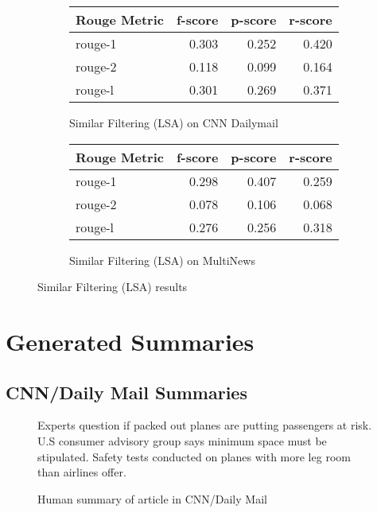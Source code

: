 \documentclass[../writeup.tex]{subfiles}
\begin{document}
\begin{figure}[H]
    \centering
    \begin{subfigure}{0.5\linewidth}
        \begin{tabular}{lrrr}
            \hline
            Rouge Metric & f-score & p-score & r-score \\
            \hline
            rouge-1      & 0.303   & 0.252   & 0.420   \\
            rouge-2      & 0.118   & 0.099   & 0.164   \\
            rouge-l      & 0.301   & 0.269   & 0.371   \\
            \hline
        \end{tabular}
        \caption{Similar Filtering (LSA) on CNN Dailymail}
    \end{subfigure}%
    \begin{subfigure}{0.5\linewidth}
        \begin{tabular}{lrrr}
            \hline
            Rouge Metric & f-score & p-score & r-score \\
            \hline
            rouge-1      & 0.298   & 0.407   & 0.259   \\
            rouge-2      & 0.078   & 0.106   & 0.068   \\
            rouge-l      & 0.276   & 0.256   & 0.318   \\
            \hline
        \end{tabular}
        \caption{Similar Filtering (LSA) on MultiNews}
    \end{subfigure}
    \caption{Similar Filtering (LSA) results}
    \label{appendix:fig:results:lsa_full}
\end{figure}



\chapter{Generated Summaries}\label{chapter:summaries}

\section{CNN/Daily Mail Summaries}\label{summaries:sec:cnn}

\begin{figure}[H]
    \centering
    {\small
        Experts question if packed out planes are putting passengers at risk.
        U.S consumer advisory group says minimum space must be stipulated.
        Safety tests conducted on planes with more leg room than airlines offer.}
    \caption{Human summary of article in CNN/Daily Mail}
    \label{appendix:fig:summaries:human_cnn}
\end{figure}
\end{document}
